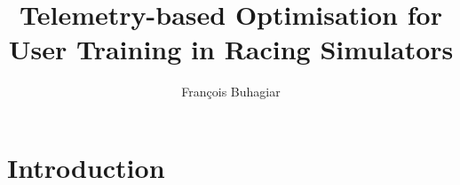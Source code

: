 \documentclass{sig-alternate}
\begin{document}
\title{Telemetry-based Optimisation for User Training in Racing Simulators}

\author{
	\alignauthor
	Fran\c{c}ois Buhagiar\\
}

\maketitle
\begin{abstract}

\end{abstract}


\def \methodname {TeAR\xspace}
\def \methodnamefull {Telemetry Assisted Racing\xspace}

\section{Introduction}
\end{document}
